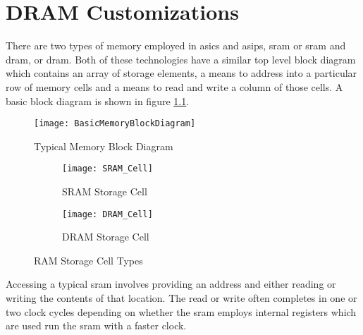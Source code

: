 
\chapter{DRAM Customizations}
\label{sec:DRAM Customizations}

There are two types of memory employed in \acp{asic} and \acp{asip}, \acl{sram} or \ac{sram} and \acl{dram}, or \ac{dram}.
Both of these technologies have a similar top level block diagram which contains an array of storage elements, a means to address into a particular row of memory cells and a means to read and write a column of those cells.
A basic block diagram is shown in figure \ref{fig:MemoryBlockDiagram}.
\begin{figure}[!t]
\centering
\captionsetup{justification=centering}
\centerline{
\mbox{\texttt{[image: BasicMemoryBlockDiagram]}}
}
\caption{Typical Memory Block Diagram \cite{Jacob:2007:MSC:1543376}}
\label{fig:MemoryBlockDiagram}
\end{figure}


\begin{figure}
\centering
\begin{subfigure}{.45\textwidth}
  \centering
  \texttt{[image: SRAM\_Cell]}
  \captionsetup{justification=centering, skip=5pt}
  \vspace{-6pt}
  \caption{SRAM Storage Cell \cite{Jacob:2007:MSC:1543376}}
  \label{fig:SRAM Cell}
\end{subfigure}%
\begin{subfigure}{.45\textwidth}
  \centering
  \texttt{[image: DRAM\_Cell]}
  \captionsetup{justification=centering, skip=5pt}
  \vspace{20pt}
  \caption{DRAM Storage Cell \cite{Jacob:2007:MSC:1543376}}
  \label{fig:DRAM Cell}
\end{subfigure}
\captionsetup{justification=centering, skip=12pt}
\caption{RAM Storage Cell Types}
\label{fig:Memory Storage Cells}
\end{figure}


Accessing a typical \ac{sram} involves providing an address and either reading or writing the contents of that location. 
The read or write often completes in one or two clock cycles depending on whether the \ac{sram} employs internal registers which are used run the \ac{sram} with a faster clock.


